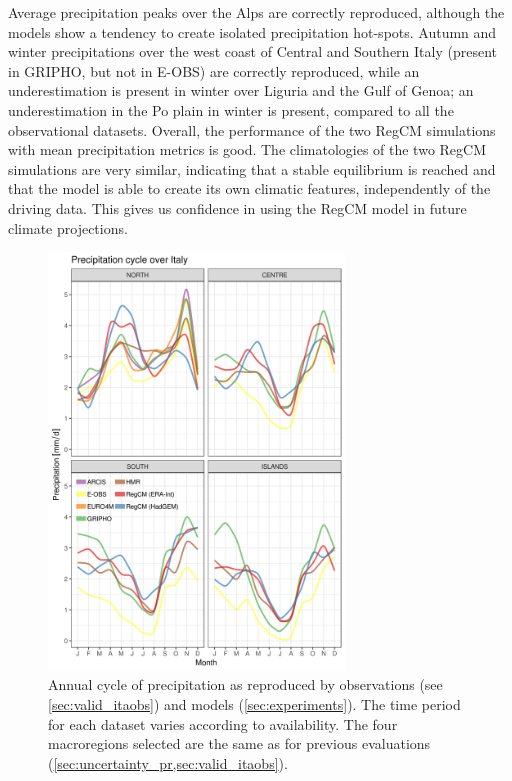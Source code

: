  Average precipitation peaks over the Alps are correctly reproduced, although the models show a tendency to create isolated precipitation hot-spots.
Autumn and winter  precipitations over the west coast of Central and Southern Italy (present in GRIPHO, but not in E-OBS) are correctly reproduced, while an underestimation is present in winter over Liguria and the Gulf of Genoa; an underestimation in the Po plain in winter is present, compared to all the observational datasets. %
Overall, the performance of the two RegCM simulations with mean precipitation metrics is good.
The climatologies of the two RegCM simulations are very similar, indicating that a stable equilibrium is reached and that the model is able to create its own climatic features, independently of the driving data.
This gives us confidence in using the RegCM model in future climate projections.\\
\begin{figure}
    \centering
    \includegraphics[width=0.7\textwidth]{figures/valid_rcm/pr/ac}
    \decoRule
    \caption[Validation of precipitation annual cycle]{
        Annual cycle of precipitation as reproduced by observations (see \cref{sec:valid_itaobs}) and models (\cref{sec:experiments}). The time period for each dataset varies according to availability. The four macroregions selected are the same as for previous evaluations (\cref{sec:uncertainty_pr,sec:valid_itaobs}).
    }\label{fig:valid_rcm_pr_ac}
\end{figure}
